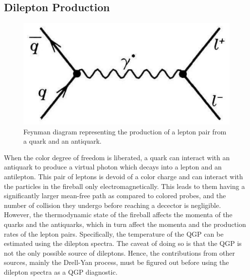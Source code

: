 \subsection{Dilepton Production}
\begin{figure}[h]
  \centering
  \includegraphics[width=4.5in]{figures/dilepton.PNG}
  \caption{Feynman diagram representing the production of a lepton pair from a quark and an antiquark. \cite{wong1994introduction}}\label{fig:dilepton}
\end{figure}
When the color degree of freedom is liberated, a quark can interact with an antiquark to produce a virtual photon which decays into a lepton and an antilepton. This pair of leptons is devoid of a color charge and can interact with the particles in the fireball only electromagnetically. This leads to them having a significantly larger mean-free path as compared to colored probes, and the number of collision they undergo before reaching a decector is negligible. However, the thermodynamic state of the fireball affects the momenta of the quarks and the antiquarks, which in turn affect the momenta and the production rates of the lepton pairs. Specifically, the temperature of the QGP can be estimated using the dilepton spectra. The caveat of doing so is that the QGP is not the only possible source of dileptons. Hence, the contributions from other sources, mainly the Drell-Yan process, must be figured out before using the dilepton spectra as a QGP diagnostic. \cite{wong1994introduction}

